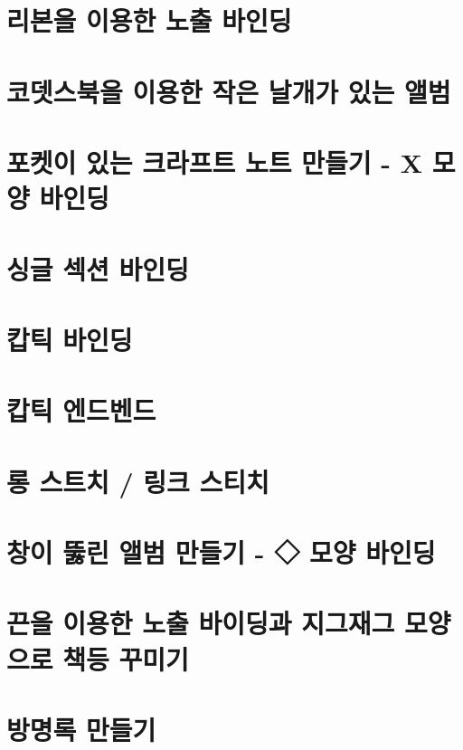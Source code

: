 \documentclass[12pt, a4paper, oneside]{book}
\begin{document}
	\section{리본을 이용한 노출 바인딩}
	\section{코뎃스북을 이용한 작은 날개가 있는 앨범}
	\section{포켓이 있는 크라프트 노트 만들기 - X 모양 바인딩}
	\section{싱글 섹션 바인딩}
	\section{캅틱 바인딩}
	\section{캅틱 엔드벤드}
	\section{롱 스트치 / 링크 스티치}
	\section{창이 뚫린 앨범 만들기 - ◇ 모양 바인딩}
	\section{끈을 이용한 노출 바이딩과 지그재그 모양으로 책등 꾸미기}
	\section{방명록 만들기}
\end{document}

